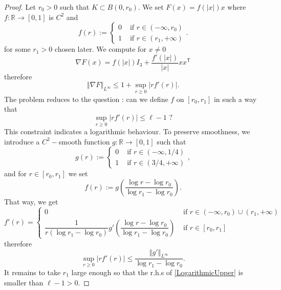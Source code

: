 \documentclass[10pt,a4paper]{amsart}
\newcommand{\R}{\mathbb{R}} %
\newcommand{\Tsf}{\mathsf{T}} %
\newcommand{\lV}{\left\Vert} %
\newcommand{\lp}{\left(} %
\newcommand{\lv}{\left\vert} %
\newcommand{\rV}{\right\Vert} %
\newcommand{\rp}{\right)} %
\newcommand{\rv}{\right\vert} %
\begin{document}
\begin{proof}
    Let $r_0>0$ such that $K\subset B(0,r_0)$. We set $F(x)=f(\lv x\rv)x$ where $f:\R\rightarrow[0,1]$ is $C^2$ and
    \begin{equation*}
        f(r):=\left\{
        \begin{array}{ll}
            0 &\mbox{ if } r\in (-\infty,r_0)\\
            
            1 &\mbox{ if } r\in(r_1,+\infty)
        \end{array}.
        \right.
    \end{equation*}
    for some $r_1>0$ chosen later. We compute for $x\not=0$
    \begin{equation*}
        \nabla F(x)=f(\lv x\rv)I_3+\frac{f'(\lv x\rv)}{\lv x\rv}xx^\Tsf
    \end{equation*}
    therefore 
    \begin{equation*}
        \lV\nabla F\rV_{L^\infty}\leq 1+\sup_{r\geq0}\lv rf'(r)\rv.
    \end{equation*}
    The problem reduces to the question : can we define $f$ on $[r_0,r_1]$ in such a way that 
    \begin{equation*}
        \sup_{r\geq0}\lv rf'(r)\rv\leq\ell-1\mbox{ ?}
    \end{equation*}
    This constraint indicates a logarithmic behaviour. To preserve smoothness, we introduce a $C^2-$smooth function $g:\R\rightarrow[0,1]$ such that
    \begin{equation*}
         g(r):=\left\{
        \begin{array}{ll}
            0 &\mbox{ if } r\in (-\infty,1/4)\\
            
            1 &\mbox{ if } r\in(3/4,+\infty)
        \end{array},
        \right.
    \end{equation*}
    and for $r\in[r_0,r_1]$ we set
    \begin{equation*}
        f(r):= g\lp\frac{\log r-\log r_0}{\log r_1-\log r_0}\rp.
    \end{equation*}
    That way, we get 
    \begin{equation*}
        f'(r)=\left\{
        \begin{array}{ll}
            0 &\mbox{ if } r\in (-\infty,r_0)\cup(r_1,+\infty)\\
            
            \dfrac{1}{r(\log r_1-\log r_0)} g'\lp\dfrac{\log r-\log r_0}{\log r_1-\log r_0}\rp &\mbox{ if } r\in[r_0,r_1]
        \end{array}
        \right.
    \end{equation*}
    therefore 
    \begin{equation}\label{LogarithmicUpper}
        \sup_{r\geq0}\lv rf'(r)\rv\leq\frac{\lV g'\rV_{L^\infty}}{\log r_1-\log r_0}.
    \end{equation}
    It remains to take $r_1$ large enough so that the r.h.s of \eqref{LogarithmicUpper} is smaller than $\ell-1>0$.
\end{proof}
\end{document}

